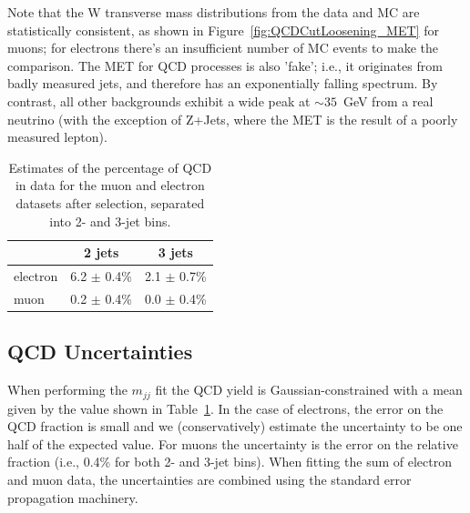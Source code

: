 Note that the W transverse mass distributions from the data and MC are
statistically consistent, as shown in
Figure~\ref{fig:QCDCutLoosening_MET} for muons; for electrons there's
an insufficient number of MC events to make the comparison.  The MET
for QCD processes is also 'fake'; i.e., it originates from badly
measured jets, and therefore has an exponentially falling spectrum.
By contrast, all other backgrounds exhibit a wide peak at $\sim
35$~GeV from a real neutrino (with the exception of Z+Jets, where the
MET is the result of a poorly measured lepton).



\begin{table}[bthp]
\begin{center}
  \begin{tabular}{l c c}
    \hline  \hline
     & 2 jets & 3 jets \\
    \hline  
    electron  &	6.2 $\pm$ 0.4\% & 2.1 $\pm$ 0.7\% \\
    muon      &	0.2 $\pm$ 0.4\% & 0.0 $\pm$ 0.4\% \\
    \hline  \hline
  \end{tabular}
\end{center}
\caption{\label{tab:qcdfrac} Estimates of the percentage of QCD in data
for the muon and electron datasets after selection, separated into 2- and
3-jet bins.}
\end{table}

\subsection{QCD Uncertainties}
\label{sec:qcd_Uncertainty}

When performing the $m_{jj}$ fit  the QCD yield 
is Gaussian-constrained with a mean given by the value shown in
Table~\ref{tab:qcdfrac}.
In the case of electrons, the error on the QCD fraction
is small and we (conservatively) estimate
the uncertainty to be one half of the expected value. For muons the 
uncertainty is the error on the relative fraction (i.e.,
0.4\% for both 2- and 3-jet bins).
When fitting the sum of electron and muon data, the uncertainties
are combined using the standard error propagation machinery.

